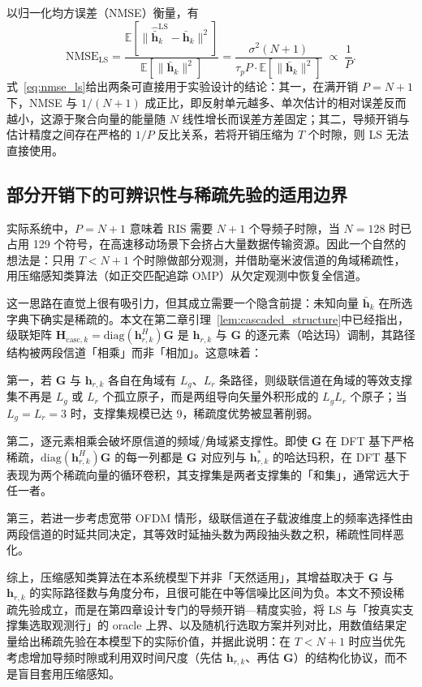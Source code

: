 以归一化均方误差（NMSE）衡量，有
\begin{equation}
  \mathrm{NMSE}_{\mathrm{LS}}
  = \frac{\mathbb{E}\left[\|\hat{\bar{\bm{h}}}_k^{\mathrm{LS}} - \bar{\bm{h}}_k\|^2\right]}{\mathbb{E}\left[\|\bar{\bm{h}}_k\|^2\right]}
  = \frac{\sigma^2 (N+1)}{\tau_p P \cdot \mathbb{E}\left[\|\bar{\bm{h}}_k\|^2\right]}
  \;\propto\; \frac{1}{P}.
  \label{eq:nmse_ls}
\end{equation}
式~\eqref{eq:nmse_ls}给出两条可直接用于实验设计的结论：其一，在满开销 $P = N+1$ 下，NMSE 与 $1/(N+1)$ 成正比，即反射单元越多、单次估计的相对误差反而越小，这源于聚合向量的能量随 $N$ 线性增长而误差方差固定；其二，导频开销与估计精度之间存在严格的 $1/P$ 反比关系，若将开销压缩为 $T$ 个时隙，则 LS 无法直接使用。

\subsection{部分开销下的可辨识性与稀疏先验的适用边界}
\label{sec:sparsity_boundary}

实际系统中，$P = N+1$ 意味着 RIS 需要 $N+1$ 个导频子时隙，当 $N = 128$ 时已占用 129 个符号，在高速移动场景下会挤占大量数据传输资源。因此一个自然的想法是：只用 $T < N+1$ 个时隙做部分观测，并借助毫米波信道的角域稀疏性，用压缩感知类算法（如正交匹配追踪 OMP）从欠定观测中恢复全信道。

这一思路在直觉上很有吸引力，但其成立需要一个隐含前提：未知向量 $\bar{\bm{h}}_k$ 在所选字典下确实是稀疏的。本文在第二章引理~\ref{lem:cascaded_structure}中已经指出，级联矩阵 $\bm{H}_{\mathrm{casc},k} = \mathrm{diag}(\bm{h}_{r,k}^H)\bm{G}$ 是 $\bm{h}_{r,k}$ 与 $\bm{G}$ 的逐元素（哈达玛）调制，其路径结构被两段信道「相乘」而非「相加」。这意味着：

第一，若 $\bm{G}$ 与 $\bm{h}_{r,k}$ 各自在角域有 $L_g$、$L_r$ 条路径，则级联信道在角域的等效支撑集不再是 $L_g$ 或 $L_r$ 个孤立原子，而是两组导向矢量外积形成的 $L_g L_r$ 个原子；当 $L_g = L_r = 3$ 时，支撑集规模已达 9，稀疏度优势被显著削弱。

第二，逐元素相乘会破坏原信道的频域/角域紧支撑性。即使 $\bm{G}$ 在 DFT 基下严格稀疏，$\mathrm{diag}(\bm{h}_{r,k}^H)\bm{G}$ 的每一列都是 $\bm{G}$ 对应列与 $\bm{h}_{r,k}^*$ 的哈达玛积，在 DFT 基下表现为两个稀疏向量的循环卷积，其支撑集是两者支撑集的「和集」，通常远大于任一者。

第三，若进一步考虑宽带 OFDM 情形，级联信道在子载波维度上的频率选择性由两段信道的时延共同决定，其等效时延抽头数为两段抽头数之积，稀疏性同样恶化。

综上，压缩感知类算法在本系统模型下并非「天然适用」，其增益取决于 $\bm{G}$ 与 $\bm{h}_{r,k}$ 的实际路径数与角度分布，且很可能在中等信噪比区间为负。本文不预设稀疏先验成立，而是在第四章设计专门的导频开销—精度实验，将 LS 与「按真实支撑集选取观测行」的 oracle 上界、以及随机行选取方案并列对比，用数值结果定量给出稀疏先验在本模型下的实际价值，并据此说明：在 $T < N+1$ 时应当优先考虑增加导频时隙或利用双时间尺度（先估 $\bm{h}_{r,k}$、再估 $\bm{G}$）的结构化协议，而不是盲目套用压缩感知。

